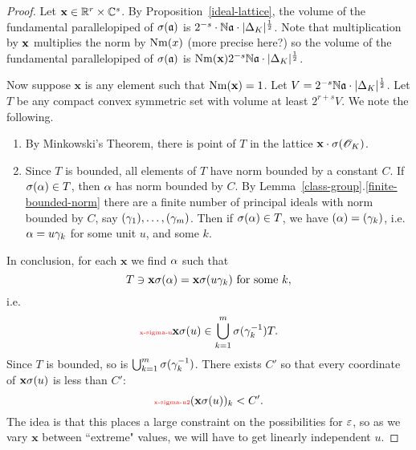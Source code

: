 \begin{proof}
Let $\textbf x\in \mathbb{R}^r\times \mathbb{C}^s$. By Proposition~\ref{ideal-lattice}, the volume of the fundamental parallelopiped of $\sigma(\mathfrak{a})$ is $2^{-s} \cdot \mathbb{N}\mathfrak{a} \cdot |\Delta_K|^{\frac{1}{2}}$. Note that multiplication by $\textbf x$ %
multiplies the norm by $\operatorname{Nm}(x)$ (more precise here?)
so the volume of the fundamental parallelopiped of $\sigma(\mathfrak{a})$ is %
$\operatorname{Nm}(\mathbf x)2^{-s}\mathbb{N}\mathfrak{a}\cdot |\Delta_K|^{\frac{1}{2}}$.

Now suppose $\mathbf x$ is any element such that $\operatorname{Nm}(\mathbf x)=1$. Let $V=2^{-s}\mathbb{N}\mathfrak{a}\cdot |\Delta_K|^{\frac{1}{2}}$. 
Let $T$ be any compact convex symmetric set with volume at least $2^{r+s}V$. 
We note the following.
\begin{enumerate}
\item By Minkowski's Theorem, there is point of $T$ in the lattice $\mathbf x\cdot \sigma(\mathscr{O}_K)$. 
\item
Since $T$ is bounded, all elements of $T$ have norm bounded by a constant $C$. If $\sigma(\alpha)\in T$, then $\alpha$ has norm bounded by $C$. By Lemma~\ref{class-group}.\ref{finite-bounded-norm} there are a finite number of principal ideals with norm bounded by $C$, say $(\gamma_1),\ldots, (\gamma_m)$. Then if $\sigma(\alpha)\in T$, we have $(\alpha)=(\gamma_k)$, i.e. $\alpha=u\gamma_k$ for some unit $u$, and some $k$.
\end{enumerate}
In conclusion, for each $\mathbf x$ we find $\alpha$ such that
\[
T\ni \mathbf x \sigma(\alpha)=\mathbf x\sigma(u\gamma_k)\text{ for some $k$},
\] 
i.e.
\begin{equation}\llabel{x-sigma-u}
\mathbf x \si(u)\in \bigcup_{k=1}^m \si(\ga_k^{-1}) T.
\end{equation}
Since $T$ is bounded, so is $\bigcup_{k=1}^m \sigma(\gamma_k^{-1})$. There exists $C'$ so that every coordinate of $\mathbf{x}\sigma(u)$ is less than $C'$:
\begin{equation}\llabel{x-sigma-u2}
(\mathbf{x}\si(u))_k<C'.
\end{equation}
The idea is that this places a large constraint on the possibilities for $\varepsilon$, so as we vary $\mathbf x$ between ``extreme" values, we will have to get linearly independent $u$.


\end{proof}
